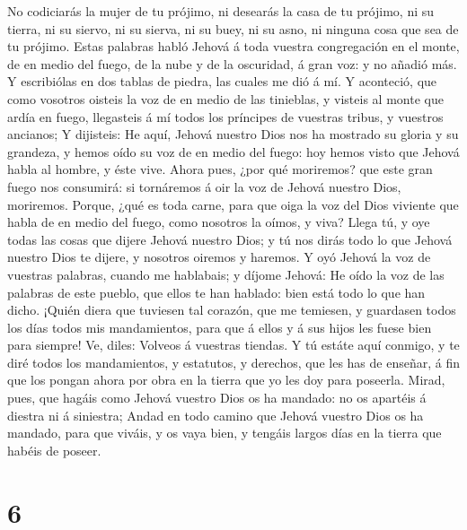 No codiciarás la mujer de tu prójimo, ni desearás la casa de tu prójimo,
ni su tierra, ni su siervo, ni su sierva, ni su buey, ni su asno, ni
ninguna cosa que sea de tu prójimo.  Estas palabras habló
Jehová á toda vuestra congregación en el monte, de en medio del fuego,
de la nube y de la oscuridad, á gran voz: y no añadió más. Y escribiólas
en dos tablas de piedra, las cuales me dió á mí.  Y
aconteció, que como vosotros oisteis la voz de en medio de las
tinieblas, y visteis al monte que ardía en fuego, llegasteis á mí todos
los príncipes de vuestras tribus, y vuestros ancianos;  Y
dijisteis: He aquí, Jehová nuestro Dios nos ha mostrado su gloria y su
grandeza, y hemos oído su voz de en medio del fuego: hoy hemos visto que
Jehová habla al hombre, y éste vive.  Ahora pues, ¿por qué
moriremos? que este gran fuego nos consumirá: si tornáremos á oir la voz
de Jehová nuestro Dios, moriremos.  Porque, ¿qué es toda
carne, para que oiga la voz del Dios viviente que habla de en medio del
fuego, como nosotros la oímos, y viva?  Llega tú, y oye
todas las cosas que dijere Jehová nuestro Dios; y tú nos dirás todo lo
que Jehová nuestro Dios te dijere, y nosotros oiremos y haremos.
 Y oyó Jehová la voz de vuestras palabras, cuando me
hablabais; y díjome Jehová: He oído la voz de las palabras de este
pueblo, que ellos te han hablado: bien está todo lo que han dicho.
 ¡Quién diera que tuviesen tal corazón, que me temiesen, y
guardasen todos los días todos mis mandamientos, para que á ellos y á
sus hijos les fuese bien para siempre!  Ve, diles: Volveos
á vuestras tiendas.  Y tú estáte aquí conmigo, y te diré
todos los mandamientos, y estatutos, y derechos, que les has de enseñar,
á fin que los pongan ahora por obra en la tierra que yo les doy para
poseerla.  Mirad, pues, que hagáis como Jehová vuestro Dios
os ha mandado: no os apartéis á diestra ni á siniestra; 
Andad en todo camino que Jehová vuestro Dios os ha mandado, para que
viváis, y os vaya bien, y tengáis largos días en la tierra que habéis de
poseer.

\hypertarget{section-5}{%
\section{6}\label{section-5}}


